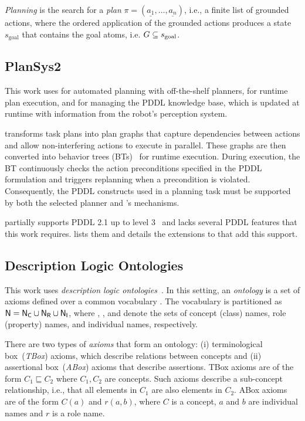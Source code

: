\emph{Planning} is the search for a \emph{plan} $\pi = (\underline{a_{1}}, \ldots{}, \underline{a_{n}})$, i.e., a finite list of grounded actions, where the ordered application of the grounded actions produces a state $s_{\text{goal}}$ that contains the goal atoms, i.e. $G \subseteq s_{\text{goal}}$.


\subsection{PlanSys2}\label{planta:sec:bg_plansys}

This work uses \plansys for automated planning with off-the-shelf planners, for runtime plan execution, and for managing the PDDL knowledge base, which is updated at runtime with information from the robot's perception system.

\plansys transforms task plans into plan graphs that capture dependencies between actions and allow non-interfering actions to execute in parallel. These graphs are then converted into behavior trees (BTs)~\cite{pddl_plans_bt} for runtime execution. During execution, the BT continuously checks the action preconditions specified in the PDDL formulation and triggers replanning when a precondition is violated. Consequently, the PDDL constructs used in a planning task must be supported by both the selected planner and \plansys's mechanisms.

\plansys partially supports PDDL 2.1 up to level 3~\cite{fox2003pddl2} and lacks several PDDL features that this work requires.  lists them and details the extensions to \plansys that add this support. %

\subsection{Description Logic Ontologies}\label{planta:sec:bg_dl}

This work uses \emph{description logic ontologies}~\cite{DBLP:books/daglib/0041477}. In this setting, an \emph{ontology} \Ont is a set of axioms defined over a common vocabulary \N. The vocabulary is partitioned as $\mathsf{N} = \mathsf{N}_\mathsf{C} \cup \mathsf{N_R} \cup \mathsf{N_I}$, where \NC, \NR, and \NI denote the sets of concept (class) names, role (property) names, and individual names, respectively.


There are two types of \emph{axioms} that form an ontology: (i) terminological box~(\emph{TBox}) axioms, which describe relations between concepts and (ii) assertional box~(\emph{ABox}) axioms that describe assertions. TBox axioms are of the form $C_1 \sqsubseteq C_2$ where $C_1, C_2$ are concepts. Such axioms describe a sub-concept relationship, i.e., that all elements in $C_1$ are also elements in $C_2$. ABox axioms are of the form $C(a)$ and $r(a,b)$, where $C$ is a concept, $a$ and $b$ are individual names and $r$ is a role name.

